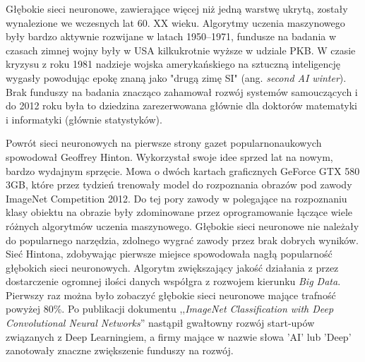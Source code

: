 \documentclass[12pt,a4paper,twoside,titlepage,openright]{book}
\begin{document}
Głębokie sieci neuronowe, zawierające więcej niż jedną warstwę ukrytą, zostały wynalezione we wczesnych lat 60. XX wieku. Algorytmy uczenia maszynowego były bardzo aktywnie rozwijane w latach 1950--1971, fundusze na badania w czasach zimnej wojny były w USA kilkukrotnie wyższe w udziale PKB. W czasie kryzysu z roku 1981 nadzieje wojska amerykańskiego na sztuczną inteligencję wygasły powodując epokę znaną jako "drugą zimę SI" (ang. \textit{second AI winter}). Brak funduszy na badania znacząco zahamował rozwój systemów samouczących i do 2012 roku była to dziedzina zarezerwowana głównie dla doktorów matematyki i informatyki (głównie statystyków). \cite{siteAIhistory}

Powrót sieci neuronowych na pierwsze strony gazet popularnonaukowych spowodował Geoffrey Hinton. Wykorzystał swoje idee sprzed lat na nowym, bardzo wydajnym sprzęcie. Mowa o dwóch kartach graficznych GeForce GTX 580 3GB\cite{NIPS2012_4824}, które przez tydzień trenowały model do rozpoznania obrazów pod zawody ImageNet Competition 2012. Do tej pory zawody w polegające na rozpoznaniu klasy obiektu na obrazie były zdominowane przez oprogramowanie łączące wiele różnych algorytmów uczenia maszynowego. Głębokie sieci neuronowe nie należały do popularnego narzędzia, zdolnego wygrać zawody przez brak dobrych wyników. Sieć Hintona, zdobywając pierwsze miejsce spowodowała nagłą popularność głębokich sieci neuronowych. Algorytm zwiększający jakość działania z przez dostarczenie ogromnej ilości danych współgra z rozwojem kierunku \textit{Big Data}. Pierwszy raz można było zobaczyć głębokie sieci neuronowe mające trafność powyżej 80\%. Po publikacji dokumentu ,,\textit{ImageNet Classification with Deep Convolutional Neural Networks}'' nastąpił gwałtowny rozwój start-upów związanych z Deep Learningiem, a firmy mające w nazwie słowa 'AI' lub 'Deep' zanotowały znaczne zwiększenie funduszy na rozwój.
\end{document}
